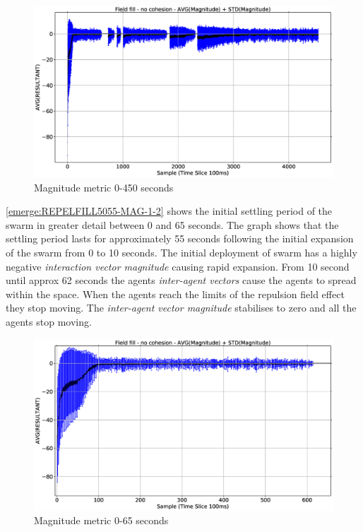 \begin{figure}[H]
\begin{center}
\includegraphics[width=12cm]{CHAPTER-8/figures/REPELFILL5055-MAG}
\end{center}
\caption{Magnitude metric 0-450 seconds\label{emerge:REPELFILL5055-MAG}}
\end{figure}

\autoref{emerge:REPELFILL5055-MAG-1-2} shows the initial settling period of the swarm in greater detail between 0 and 65 seconds. The graph shows that the settling period lasts for approximately 55 seconds following the initial expansion of the swarm from 0 to 10 seconds. The initial deployment of swarm has a highly negative \textit{interaction vector magnitude} causing rapid expansion. From 10 second until approx 62 seconds the agents \textit{inter-agent vectors} cause the agents to spread within the space. When the agents reach the limits of the repulsion field effect they stop moving. The \textit{inter-agent vector magnitude} stabilises to zero and all the agents stop moving.

\begin{figure}[H]
\begin{center}
\includegraphics[width=12cm]{CHAPTER-8/figures/REPELFILL5055-MAG-1-2}
\end{center}
\caption{Magnitude metric 0-65 seconds\label{emerge:REPELFILL5055-MAG-1-2}}
\end{figure}

